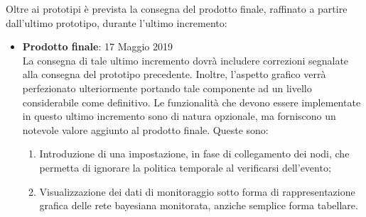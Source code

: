 Oltre ai prototipi è prevista la consegna del prodotto finale, raffinato a partire dall'ultimo prototipo, durante l'ultimo incremento:
\begin{itemize}
	\item \textbf{Prodotto finale}: 17 Maggio 2019\\
	La consegna di tale ultimo incremento dovrà includere correzioni segnalate alla consegna del prototipo precedente. Inoltre, l'aspetto grafico verrà perfezionato ulteriormente portando tale componente ad un livello considerabile come definitivo. Le funzionalità che devono essere implementate in questo ultimo incremento sono di natura opzionale, ma forniscono un notevole valore aggiunto al prodotto finale. Queste sono:
	\begin{enumerate}
		\item Introduzione di una impostazione, in fase di collegamento dei nodi, che permetta di ignorare la politica temporale al verificarsi dell'evento;
		\item Visualizzazione dei dati di monitoraggio sotto forma di rappresentazione grafica delle rete bayesiana monitorata, anziche semplice forma tabellare.
	\end{enumerate}
\end{itemize}




